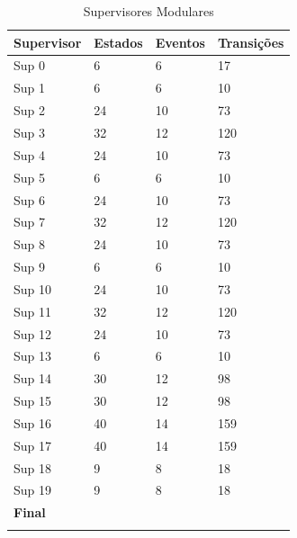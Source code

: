 \begin{table}[h]
\begin{center}
\begin{minipage}{0.5\textwidth}
\caption{Supervisores Modulares}
\label{tab:supervisor}
\begin{tabular}{@{}llll@{}}
  \toprule
  Supervisor & Estados & Eventos & Transições\\
  \midrule
  Sup 0 & 6 & 6 & 17\\
  Sup 1 & 6 & 6 & 10\\
  Sup 2 & 24 & 10 & 73\\
  Sup 3 & 32 & 12 & 120\\
  Sup 4 & 24 & 10 & 73\\
  Sup 5 & 6 & 6 & 10\\
  Sup 6 & 24 & 10 & 73\\
  Sup 7 & 32 & 12 & 120\\
  Sup 8 & 24 & 10 & 73\\
  Sup 9 & 6 & 6 & 10\\
  Sup 10 & 24 & 10 & 73\\
  Sup 11 & 32 & 12 & 120\\
  Sup 12 & 24 & 10 & 73\\
  Sup 13 & 6 & 6 & 10\\
  Sup 14 & 30 & 12 & 98\\
  Sup 15 & 30 & 12 & 98\\
  Sup 16 & 40 & 14 & 159\\
  Sup 17 & 40 & 14 & 159\\
  Sup 18 & 9 & 8 & 18\\
  Sup 19 & 9 & 8 & 18\\
  \midrule
  \textbf{Final} & & &\\
  \botrule
\end{tabular}
\end{minipage}
\end{center}
\end{table}